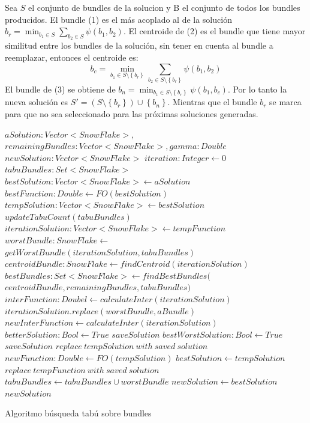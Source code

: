 Sea $S$ el conjunto de bundles de la solucion y B el conjunto de todos los bundles producidos. El bundle (1) es el más acoplado al de la solución $b_r = \min_{b_1 \in S}{\sum_{b_2 \in S}{\psi(b_1,b_2)}}$. El centroide de (2) es el bundle que tiene mayor similitud entre los bundles de la solución, sin tener en cuenta al bundle a reemplazar, entonces el centroide es:
$$b_c = \min_{b_1 \in S \setminus \left\{b_r\right\}}{\sum_{b_2 \in S \setminus \left\{b_r\right\}}{\psi(b_1,b_2)}}$$
El bundle de (3) se obtiene de $b_n = \min_{b_1 \in S \setminus \left\{b_r\right\}}{\psi(b_1,b_c)}$. Por lo tanto la nueva solución es $S' = (S \setminus \left\{b_r\right\}) \cup \left\{b_n\right\}$. Mientras que el bundle $b_r$ se marca para que no sea seleccionado para las próximas soluciones generadas.
\begin{algorithm}[H]
\begin{algorithmic}[1]
\REQUIRE $aSolution: Vector<SnowFlake>, $\\
         $remainingBundles: Vector<SnowFlake>, gamma: Double$
\ENSURE $newSolution:Vector<SnowFlake>$
\STATE $iteration:Integer \leftarrow 0$
\STATE $tabuBundles: Set<SnowFlake>$
\STATE $bestSolution: Vector<SnowFlake> \leftarrow aSolution$
\STATE $bestFunction:Double \leftarrow FO(bestSolution)$
\STATE $tempSolution: Vector<SnowFlake> \leftarrow bestSolution$
  \STATE $updateTabuCount(tabuBundles)$
  \STATE $iterationSolution: Vector<SnowFlake> \leftarrow tempFunction$
  \STATE $worstBundle: SnowFlake \leftarrow$\\
         $getWorstBundle(iterationSolution, tabuBundles)$
  \STATE $centroidBundle: SnowFlake \leftarrow findCentroid(iterationSolution)$
  \STATE $bestBundles: Set<SnowFlake> \leftarrow findBestBundles($\\
         $centroidBundle, remainingBundles, tabuBundles)$
  \STATE $interFunction: Doubel \leftarrow calculateInter(iterationSolution)$
    \STATE $iterationSolution.replace(worstBundle, aBundle)$
    \STATE $newInterFunction \leftarrow calculateInter(iterationSolution)$
      \STATE $betterSolution: Bool \leftarrow True$
      \STATE $saveSolution$
    \ELSE
        \STATE $bestWorstSolution: Bool \leftarrow True$
        \STATE $saveSolution$
      \ENDIF
    \ENDIF
  \ENDFOR
    \STATE $replace\ tempSolution\ with\ saved\ solution$
    \STATE $newFunction: Double \leftarrow FO(tempSolution)$
      \STATE $bestSolution \leftarrow tempSolution$
    \ENDIF
  \ELSE
      \STATE $replace\ tempFunction\ with\ saved\ solution$
    \ENDIF
  \ENDIF
  \STATE $tabuBundles \leftarrow tabuBundles \cup {worstBundle}$
\ENDWHILE
\STATE $newSolution \leftarrow bestSolution$
\RETURN $newSolution$
\end{algorithmic}
\caption{Algoritmo búsqueda tabú sobre bundles}\label{alg:algBusTabuBundle}
\end{algorithm}

